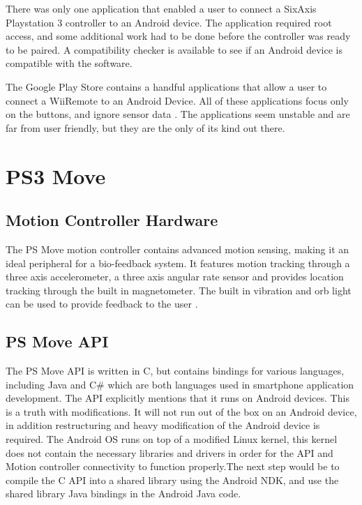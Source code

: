 There was only one application\cite{sixaxisController} that enabled a user to connect a SixAxis Playstation 3 controller to an Android device. The application required root access, and some additional work had to be done before the controller was ready to be paired. A compatibility checker is available to see if an Android device is compatible with the software.

The Google Play Store contains a handful applications that allow a user to connect a WiiRemote to an Android Device. All of these applications focus only on the buttons, and ignore sensor data \cite{wiimoteController, simpleWiiController}. The applications seem unstable and are far from user friendly, but they are the only of its kind out there.

\section{PS3 Move}

\subsection{Motion Controller Hardware}
The PS Move motion controller contains advanced motion sensing, making it an ideal peripheral for a bio-feedback system. It features motion tracking through a three axis accelerometer, a three axis angular rate sensor and provides location tracking through the built in magnetometer. The built in vibration and orb light can be used to provide feedback to the user \cite{psMoveTech}.

\subsection{PS Move API}
The PS Move API \cite{PSMoveAPI} is written in C, but contains bindings for various languages, including Java and C\# which are both languages used in smartphone application development. The API explicitly mentions that it runs on Android devices. This is a truth with modifications. It will not run out of the box on an Android device, in addition restructuring and heavy modification of the Android device is required. The Android OS runs on top of a modified Linux kernel, this kernel does not contain the necessary libraries and drivers in order for the API and Motion controller connectivity to function properly.The next step would be to compile the C API into a shared library using the Android NDK, and use the shared library Java bindings in the Android Java code.

